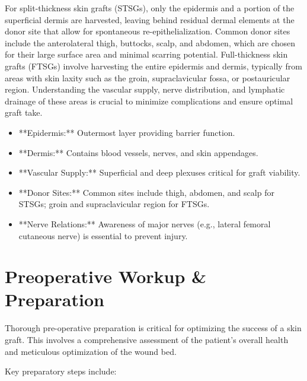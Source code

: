 For split-thickness skin grafts (STSGs), only the epidermis and a portion of the superficial dermis are harvested, leaving behind residual dermal elements at the donor site that allow for spontaneous re-epithelialization. Common donor sites include the anterolateral thigh, buttocks, scalp, and abdomen, which are chosen for their large surface area and minimal scarring potential. Full-thickness skin grafts (FTSGs) involve harvesting the entire epidermis and dermis, typically from areas with skin laxity such as the groin, supraclavicular fossa, or postauricular region. Understanding the vascular supply, nerve distribution, and lymphatic drainage of these areas is crucial to minimize complications and ensure optimal graft take.

\begin{itemize}
  \item **Epidermis:** Outermost layer providing barrier function.
  \item **Dermis:** Contains blood vessels, nerves, and skin appendages.
  \item **Vascular Supply:** Superficial and deep plexuses critical for graft viability.
  \item **Donor Sites:** Common sites include thigh, abdomen, and scalp for STSGs; groin and supraclavicular region for FTSGs.
  \item **Nerve Relations:** Awareness of major nerves (e.g., lateral femoral cutaneous nerve) is essential to prevent injury.
\end{itemize}

\section*{Preoperative Workup \& Preparation}
Thorough pre-operative preparation is critical for optimizing the success of a skin graft. This involves a comprehensive assessment of the patient's overall health and meticulous optimization of the wound bed.

Key preparatory steps include:

